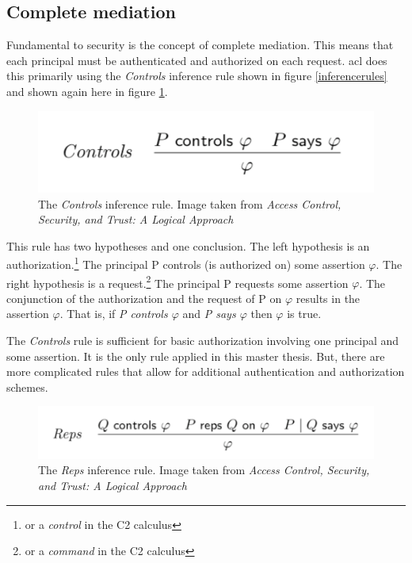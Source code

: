 \documentclass[../../main/main.tex]{subfiles}
\begin{document}
\subsection{Complete mediation}\label{ssec:aclcompletemediation}
Fundamental to security is the concept of complete mediation.  This means that each principal must be authenticated and authorized on each request.   \gls{acl} does this primarily using the \textit{Controls} inference rule shown in figure \ref{inferencerules} and shown again here in figure \ref{ControlsInferenceRule}. 

\begin{figure}[h]
\centering
\includegraphics{../figures/ControlsInferenceRule}
\caption{\label{ControlsInferenceRule}The \textit{Controls} inference rule. Image taken from \textit{Access Control, Security, and Trust: A Logical Approach}\cite{ChinOlder}}
\end{figure}

This rule has two hypotheses and one conclusion. The left hypothesis is an authorization.\footnote{or a \textit{control} in the C2 calculus}  The principal P controls (is authorized on) some assertion $\varphi$. The right hypothesis is a request.\footnote{or a \textit{command} in the C2 calculus}  The principal P requests some assertion $\varphi$. The conjunction of the authorization and the request of P on $\varphi$ results in the assertion $\varphi$.  That is, if \textit{P controls $\varphi$} and\textit{ P says $\varphi$} then $\varphi$  is true.  

The \textit{Controls} rule is sufficient for basic authorization involving one principal and some assertion.  It is the only rule applied in this master thesis.  But, there are more complicated rules that allow for additional authentication and authorization schemes.  

\begin{figure}[h]
\centering
\includegraphics[width =0.7 \textwidth]{../figures/repsrule}
\caption{\label{repsrule}The \textit{Reps} inference rule. Image taken from \textit{Access Control, Security, and Trust: A Logical Approach}\cite{ChinOlder}}
\end{figure}
\end{document}
